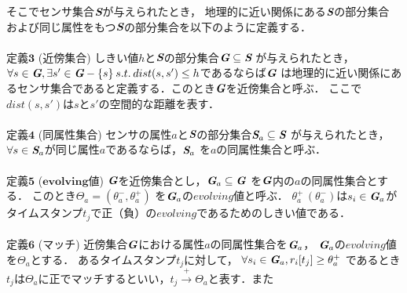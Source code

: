 \documentclass[11pt,j4a]{jarticle}
\begin{document}
そこでセンサ集合$\textit{\textbf{S}}$が与えられたとき，
地理的に近い関係にある$\textit{\textbf{S}}$の部分集合
および同じ属性をもつ$\textit{\textbf{S}}$の部分集合を以下のように定義する．
\\\\
$\textbf{定義3}$ \hspace{2pt} ($\textbf{近傍集合}$) \hspace{2pt}
しきい値$h$と$\textit{\textbf{S}}$の部分集合$\textit{\textbf{G}} \subseteq \textit{\textbf{S}}$
が与えられたとき，
$\forall s \in \textit{\textbf{G}}, \exists s' \in \textit{\textbf{G}}-\{s\}
\hspace{2pt} s.t. \hspace{2pt} dist(s,s') \leq h$であるならば$\textit{\textbf{G}}$
は地理的に近い関係にあるセンサ集合であると定義する．このとき$\textit{\textbf{G}}$を近傍集合と呼ぶ．
ここで$dist(s,s')$は$s$と$s'$の空間的な距離を表す．
\\\\
$\textbf{定義4}$ \hspace{2pt} ($\textbf{同属性集合}$) \hspace{2pt}
センサの属性$a$と$\textit{\textbf{S}}$の部分集合$\textit{\textbf{S}}_{a} \subseteq \textit{\textbf{S}}$
が与えられたとき，$\forall s \in \textit{\textbf{S}}_{a}$が同じ属性$a$であるならば，$\textit{\textbf{S}}_{a}$
を$a$の同属性集合と呼ぶ．
\\\\
$\textbf{定義5}$ \hspace{2pt} ($\textbf{evolving値}$) \hspace{2pt}
$\textit{\textbf{G}}$を近傍集合とし，$\textit{\textbf{G}}_{a} \subseteq \textit{\textbf{G}}$
を$\textit{\textbf{G}}$内の$a$の同属性集合とする．
このとき$\Theta_{a}=(\theta_{a}^{-},\theta_{a}^{+})$
を$\textit{\textbf{G}}_{a}$の$evolving値$と呼ぶ．
$\theta_{a}^{+} \hspace{2pt} (\theta_{a}^{-})$は$s_{i} \in \textit{\textbf{G}}_{a}$が
タイムスタンプ$t_{j}$で正（負）の$evolving$であるためのしきい値である．
\\\\
$\textbf{定義6}$ \hspace{2pt} ($\textbf{マッチ}$) \hspace{2pt}
近傍集合$\textit{\textbf{G}}$における属性$a$の同属性集合を$\textit{\textbf{G}}_{a}$，
$\textit{\textbf{G}}_{a}$の$evolving値$を$\Theta_{a}$とする．
あるタイムスタンプ$t_{j}$に対して，
$\forall s_{i} \in \textit{\textbf{G}}_{a},r_{i}[t_{j}] \geq \theta_{a}^{+}$
であるとき$t_{j}$は$\Theta_{a}$に正でマッチするといい，$t_{j} \xrightarrow{+} \Theta_{a}$と表す．また
\end{document}

